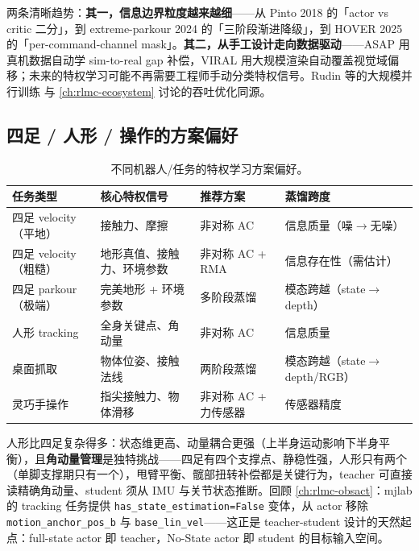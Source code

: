 两条清晰趋势：\textbf{其一，信息边界粒度越来越细}——从 Pinto 2018 的「actor vs critic 二分」，到 extreme-parkour 2024 的「三阶段渐进降级」，到 HOVER 2025 的「per-command-channel mask」。\textbf{其二，从手工设计走向数据驱动}——ASAP \cite{he2025asap} 用真机数据自动学 sim-to-real gap 补偿，VIRAL 用大规模渲染自动覆盖视觉域偏移；未来的特权学习可能不再需要工程师手动分类特权信号。Rudin 等的大规模并行训练 \cite{rudin2021minutes} 与 \cref{ch:rlmc-ecosystem} 讨论的吞吐优化同源。

\subsection{四足 / 人形 / 操作的方案偏好}
\label{sec:rlmc-priv-byrobot}

\begin{table}[H]
\centering
\small
\caption{不同机器人/任务的特权学习方案偏好。}
\label{tab:rlmc-priv-byrobot}
\begin{tabular}{@{}p{3.4cm}p{3.4cm}p{2.8cm}p{3.0cm}@{}}
\toprule
任务类型 & 核心特权信号 & 推荐方案 & 蒸馏跨度 \\
\midrule
四足 velocity（平地） & 接触力、摩擦 & 非对称 AC & 信息质量（噪$\to$无噪） \\
四足 velocity（粗糙） & 地形真值、接触力、环境参数 & 非对称 AC + RMA & 信息存在性（需估计） \\
四足 parkour（极端） & 完美地形 + 环境参数 & 多阶段蒸馏 & 模态跨越（state$\to$depth） \\
人形 tracking & 全身关键点、角动量 & 非对称 AC & 信息质量 \\
桌面抓取 & 物体位姿、接触法线 & 两阶段蒸馏 & 模态跨越（state$\to$depth/RGB） \\
灵巧手操作 & 指尖接触力、物体滑移 & 非对称 AC + 力传感器 & 传感器精度 \\
\bottomrule
\end{tabular}
\end{table}

人形比四足复杂得多：状态维更高、动量耦合更强（上半身运动影响下半身平衡），且\textbf{角动量管理}是独特挑战——四足有四个支撑点、静稳性强，人形只有两个（单脚支撑期只有一个），甩臂平衡、髋部扭转补偿都是关键行为，teacher 可直接读精确角动量、student 须从 IMU 与关节状态推断。回顾 \cref{ch:rlmc-obsact}：mjlab 的 tracking 任务提供 \verb|has_state_estimation=False| 变体，从 actor 移除 \verb|motion_anchor_pos_b| 与 \verb|base_lin_vel|——这正是 teacher-student 设计的天然起点：full-state actor 即 teacher，No-State actor 即 student 的目标输入空间。

